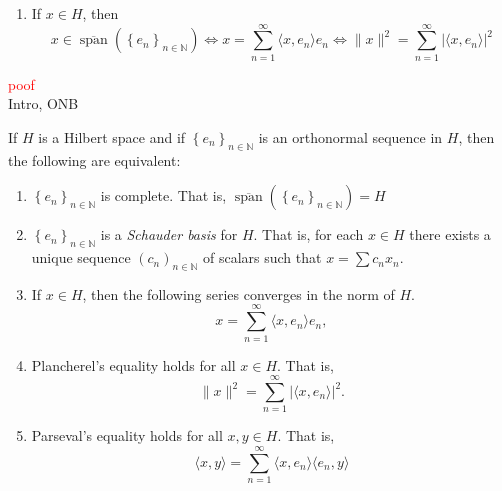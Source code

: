 \begin{theorem}
\begin{enumerate}[label=(\alph*)]
        \item \label{eq:opfaf_e} If $x \in H$, then 
        \begin{equation}
            x\in \overline{\operatorname{span}} \left( \left\{ e_{n} \right\}_{n\in \mathbb{N}} \right) \Longleftrightarrow x=\sum_{n=1}^{\infty} \langle x, e_n \rangle e_n \Longleftrightarrow \| x\|^2 = \sum_{n=1}^{\infty} \left| \langle x,e_n\rangle \right|^2
        \end{equation}
    \end{enumerate}
\end{theorem}
%
%
\textcolor{red}{poof}\\
Intro, ONB
%
%
\begin{theorem}\label{thrm:orthonormal_equivalences}
    If $H$ is a Hilbert space and if $\left\{ e_{n} \right\}_{n\in \mathbb{N}}$ is an orthonormal sequence in $H$,  then the following are equivalent:
    \begin{enumerate}[label=(\alph*)]
        \item \label{eq:oe_a} $\left\{ e_{n} \right\}_{n\in \mathbb{N}}$ is complete. That is, $\overline{\operatorname{span}} \left( \left\{ e_{n} \right\}_{n\in \mathbb{N}} \right) = H$
        
        \item \label{eq:oe_b} $\left\{ e_{n} \right\}_{n\in \mathbb{N}}$ is a \emph{Schauder basis} for $H$. That is, for each $x\in H$ there exists a unique sequence  $(c_n)_{n\in\mathbb{N}}$ of scalars such that $x = \sum c_n x_n$.
        
        \item \label{eq:oe_c} If $x\in H$, then the following series converges in the norm of $H$. \begin{equation} \label{eq:orthonormal_equivalences_3} x=\sum_{n=1}^\infty \langle x,e_n\rangle e_n, \end{equation}
        
        \item \label{eq:oe_d} Plancherel's equality holds for all $x \in H$. That is, $$ \|x \|^2 = \sum_{n=1}^\infty \left| \langle x,e_n \rangle \right|^2.$$
        
        \item \label{eq:oe_e} Parseval's equality holds for all $x,y \in H$. That is, $$ \langle x,y \rangle = \sum_{n=1}^\infty \langle x,e_n \rangle \langle e_n,y \rangle $$
    \end{enumerate}
\end{theorem}

